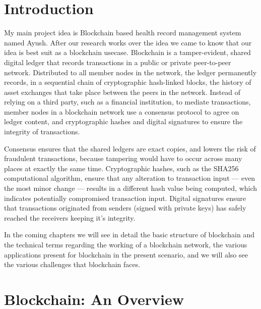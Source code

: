 \documentclass[12pt]{report}
\begin{document}
\tableofcontents
{}

\listoffigures


\chapter{Introduction}
 \par My main project idea is Blockchain based health record management system named Ayush. After our research works over the idea we came to know that our idea is best suit as a blockchain usecase. Blockchain is a tamper-evident, shared digital ledger that records transactions in a public or private peer-to-peer network. Distributed to all member nodes in the network, the ledger permanently records, in a sequential chain of cryptographic hash-linked blocks, the history of asset exchanges that take place between the peers in the network. Instead of relying on a third party, such as a financial institution, to mediate transactions, member nodes in a blockchain network use a consensus protocol to agree on ledger content, and cryptographic hashes and digital signatures to ensure the integrity of transactions.
 \newline
 \par Consensus ensures that the shared ledgers are exact copies, and lowers the risk of fraudulent transactions, because tampering would have to occur across many places at exactly the same time. Cryptographic hashes, such as the SHA256 computational algorithm, ensure that any alteration to transaction input — even the most minor change — results in a different hash value being computed, which indicates potentially compromised transaction input. Digital signatures ensure that transactions originated from senders (signed with private keys) has safely reached the receivers keeping it's integrity.
 \newline
 \par In the coming chapters we will see in detail the basic structure of blockchain and the technical terms regarding the working of a blockchain network, the various applications present for blockchain in the present scenario, and we will also see the various challenges that blockchain faces.

\chapter{Blockchain: An Overview}
\end{document}
